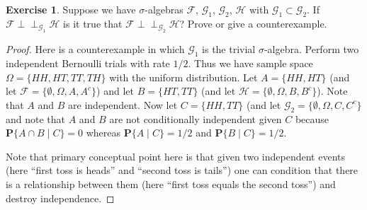 \documentclass{amsbook}
\theoremstyle{definition}
\newtheorem{xca}{Exercise}
\theoremstyle{remark}
\newcommand{\Independent}{\perp \! \! \! \perp}
\newcommand{\cindependent}[3]{#1 \Independent_{#3} #2}
\newcommand{\cprobability}[2]{\textbf{P}\{#2 \mid #1\}}
\begin{document}
\begin{xca}Suppose we have $\sigma$-algebras $\mathcal{F}$,
  $\mathcal{G}_1$, $\mathcal{G}_2$, $\mathcal{H}$ with $\mathcal{G}_1
  \subset \mathcal{G}_2$.  If
  $\cindependent{\mathcal{F}}{\mathcal{H}}{\mathcal{G}_1}$
is it true that $\cindependent{\mathcal{F}}{\mathcal{H}}{\mathcal{G}_2}$?
Prove or give a counterexample.
\end{xca}
\begin{proof}
Here is a counterexample in which $\mathcal{G}_1$ is the trivial
$\sigma$-algebra.  Perform two independent Bernoulli trials with rate
$1/2$.  Thus we have sample space $\Omega = \lbrace HH, HT, TT, TH
\rbrace$ with the uniform distribution.  Let $A = \lbrace HH, HT
\rbrace$ (and let $\mathcal{F} = \lbrace \emptyset, \Omega, A, A^c
\rbrace$) and let $B = \lbrace HT, TT \rbrace$ (and let $\mathcal{H} =
\lbrace \emptyset , \Omega, B, B^c \rbrace$).  Note that $A$ and $B$
are independent.  Now let $C = \lbrace HH, TT \rbrace$ (and let
$\mathcal{G}_2 = \lbrace \emptyset, \Omega, C, C^c \rbrace$ and note
that $A$ and $B$ are not conditionally independent given $C$ because
$\cprobability{C}{A \cap B} = 0$ whereas $\cprobability{C}{A} = 1/2$
and $\cprobability{C}{B} = 1/2$.

Note
that primary conceptual point here is that given two independent
events (here ``first toss is heads'' and ``second toss is tails'') one
can condition that there is a relationship between them (here ``first toss
equals the second toss'') and destroy independence.  
\end{proof}
\end{document}
